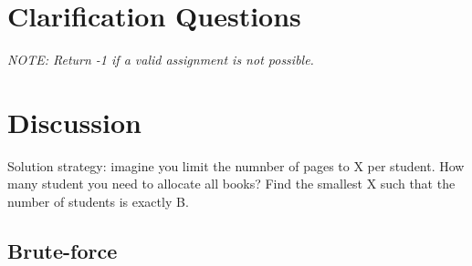 \section{Clarification Questions}

\begin{QandA}
	\item 
	\begin{answered}
		\textit{NOTE: Return -1 if a valid assignment is not possible.
		}
	\end{answered}
	
\end{QandA}

\section{Discussion}
\label{allocate_books:sec:discussion}
Solution strategy:
imagine you limit the numnber of pages to X per student. How many student you need to allocate all books?
Find the smallest X such that the number of students is exactly B.

\subsection{Brute-force}
\label{allocate_books:sec:bruteforce}

\begin{minipage}{\linewidth}
	
\end{minipage}

